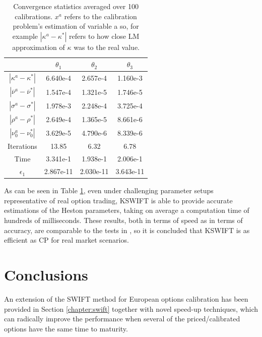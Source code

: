 \documentclass[12,twoside]{mammeTFM}
\theoremstyle{definition}
\theoremstyle{remark}
\begin{document}
\begin{table}[!h]
\begin{center}
 \begin{tabular}{|c | c | c | c|} 
 \hline
  & $\theta_1$ & $\theta_2$ & $\theta_3$\\ [0.5ex] 
 \hline
 $|\kappa^{a} - \kappa^{*}|$ & 6.640e-4 & 2.657e-4 & 1.160e-3 \\ 
 \hline
 $|\overline{\nu}^{a} - \overline{\nu}^{*}|$ & 1.547e-4 & 1.321e-5 & 1.746e-5\\
 \hline
 $|\sigma^{a} - \sigma^{*}|$ & 1.978e-3 & 2.248e-4 & 3.725e-4 \\
 \hline
 $|\rho^{a} - \rho^{*}|$ & 2.649e-4 & 1.365e-5 & 8.661e-6  \\
 \hline
 $|\nu_0^{a} - \nu_0^{*}|$ & 3.629e-5 & 4.790e-6 & 8.339e-6  \\
 \hline
 Iterations & 13.85 & 6.32 & 6.78 \\
 \hline
 Time & 3.341e-1 & 1.938e-1 & 2.006e-1 \\
 \hline
 $\epsilon_1$ & 2.867e-11 & 2.030e-11 & 3.643e-11\\
 \hline
\end{tabular}
\caption{Convergence statistics averaged over 100 calibrations. $x^a$ refers to the calibration problem's estimation of variable a so, for example $|\kappa^{a} - \kappa^{*}|$ refers to how close LM approximation of $\kappa$ was to the real value.}\label{table:realistic}
\end{center}
\end{table}

As can be seen in Table \ref{table:realistic}, even under challenging parameter setups representative of real option trading, KSWIFT is able to provide accurate estimations of the Heston parameters, taking on average a computation time of hundreds of milliseconds. These results, both in terms of speed as in terms of accuracy, are comparable to the tests in \cite{cui17}, so it is concluded that KSWIFT is as efficient as CP for real market scenarios.

\section{Conclusions} \label{chap:conclusions}

An extension of the SWIFT method for European options calibration has been provided in Section \ref{chapter:swift} together with novel speed-up techniques, which can radically improve the performance when several of the priced/calibrated options have the same time to maturity.
\end{document}
